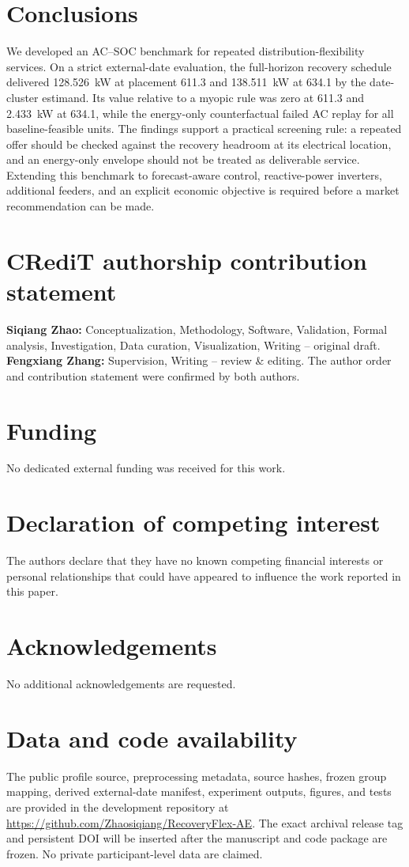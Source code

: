 \documentclass[11pt]{article}
\newcommand{\kw}[1]{#1~kW}
\begin{document}
\section{Conclusions}
We developed an AC--SOC benchmark for repeated distribution-flexibility services. On a strict external-date evaluation, the full-horizon recovery schedule delivered \kw{128.526} at placement 611.3 and \kw{138.511} at 634.1 by the date-cluster estimand. Its value relative to a myopic rule was zero at 611.3 and \kw{2.433} at 634.1, while the energy-only counterfactual failed AC replay for all baseline-feasible units. The findings support a practical screening rule: a repeated offer should be checked against the recovery headroom at its electrical location, and an energy-only envelope should not be treated as deliverable service. Extending this benchmark to forecast-aware control, reactive-power inverters, additional feeders, and an explicit economic objective is required before a market recommendation can be made.

\section*{CRediT authorship contribution statement}
\textbf{Siqiang Zhao:} Conceptualization, Methodology, Software, Validation, Formal analysis, Investigation, Data curation, Visualization, Writing -- original draft. \textbf{Fengxiang Zhang:} Supervision, Writing -- review \& editing. The author order and contribution statement were confirmed by both authors.

\section*{Funding}
No dedicated external funding was received for this work.

\section*{Declaration of competing interest}
The authors declare that they have no known competing financial interests or personal relationships that could have appeared to influence the work reported in this paper.

\section*{Acknowledgements}
No additional acknowledgements are requested.

\section*{Data and code availability}
The public profile source, preprocessing metadata, source hashes, frozen group mapping, derived external-date manifest, experiment outputs, figures, and tests are provided in the development repository at \url{https://github.com/Zhaosiqiang/RecoveryFlex-AE}. The exact archival release tag and persistent DOI will be inserted after the manuscript and code package are frozen. No private participant-level data are claimed.
\end{document}

